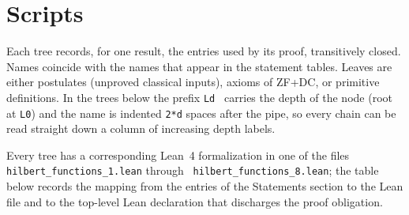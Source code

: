 \documentclass[11pt,reqno]{amsart}
\begin{document}
\section{Scripts}

\label{sec:scripts} 
\noindent Each tree records, for one result, the entries used by its proof,
transitively closed. Names coincide with the names that appear in the
statement tables. Leaves are either postulates (unproved classical inputs),
axioms of \textsf{ZF+DC}, or primitive definitions. In the trees below the
prefix \verb|Ld | carries the depth of the node (root at \verb|L0|) and the
name is indented \verb|2*d| spaces after the pipe, so every chain can be
read straight down a column of increasing depth labels.

\medskip \noindent Every tree has a corresponding Lean~4 formalization in
one of the files \texttt{hilbert\_functions\_1.lean} through \texttt{%
hilbert\_functions\_8.lean}; the table below records the mapping from the
entries of the Statements section to the Lean file and to the top-level Lean
declaration that discharges the proof obligation.%
\end{document}
